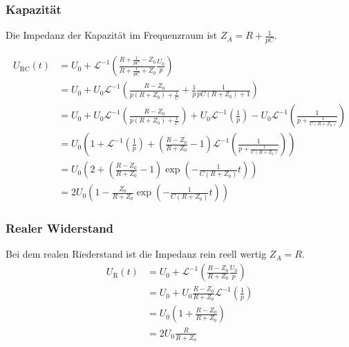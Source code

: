 \subsubsection{Kapazität}
Die Impedanz der Kapazität im Frequenzraum ist $Z_A = R + \frac{1}{pC}$.

\begin{align*}
	U_\text{RC}(t) 
	&= U_0 + \mathcal{L}^{-1}\left(\frac{R+ \frac{1}{pC}-Z_0}{R+ \frac{1}{pC}+Z_0}\frac{U_0}{p}\right) \\
	&= U_0 + U_0 \mathcal{L}^{-1} \left( \frac{R-Z_0}{p(R+Z_0) +  \frac{1}{C}}   
	+ \frac{1}{p} \frac{1}{pC(R+Z_0) +1 } \right) \\
	&= U_0 + U_0\mathcal{L}^{-1} \left( \frac{R-Z_0}{p(R+Z_0) +  \frac{1}{C}} \right) + U_0  \mathcal{L}^{-1} \left( \frac{1}{p} \right) - U_0 \mathcal{L}^{-1} \left( \frac{1}{p + \frac{1}{C(R+Z_0)}} \right) \\
		&= U_0\left( 1+  \mathcal{L}^{-1} \left( \frac{1}{p}\right) +  \left(\frac{R-Z_0}{R+Z_0}-1\right) \mathcal{L}^{-1} \left( \frac{1}{p + \frac{1}{C(R+Z_0)}} \right) \right) \\
		&= U_0\left(2 +  \left(\frac{R-Z_0}{R+Z_0}-1\right) \exp \left( - \frac{1}{C(R+Z_0)} t\right)  \right) \\
	&= 2U_0\left(1 -  \frac{Z_0}{R+Z_0} \exp \left( - \frac{1}{C(R+Z_0)} t\right)  \right)
\end{align*}

\subsubsection{Realer Widerstand}
Bei dem realen Riederstand ist die Impedanz rein reell wertig $Z_A = R$.
\begin{align*}
	U_\text{R}(t) 
	&= U_0 + \mathcal{L}^{-1}\left(\frac{R -Z_0}{R +Z_0}\frac{U_0}{p}\right) \\
	&= U_0 + U_0\frac{R -Z_0}{R +Z_0} \mathcal{L}^{-1}\left(\frac{1}{p} \right) \\
	&= U_0\left(1 +  \frac{R -Z_0}{R +Z_0} \right) \\
	&= 2 U_0 \frac{R}{R+Z_0}
\end{align*}

